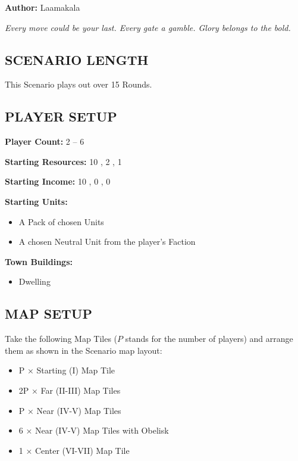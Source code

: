 
\begin{multicols*}{2}

\textbf{Author:} Laamakala

\textit{Every move could be your last. Every gate a gamble. Glory belongs to the bold.}

\subsection*{\MakeUppercase{Scenario Length}}
This Scenario plays out over 15 Rounds.

\subsection*{\MakeUppercase{Player Setup}}
\textbf{Player Count:} 2 -- 6

\textbf{Starting Resources:} 10 , 2 , 1 

\textbf{Starting Income:} 10 , 0 , 0 

\textbf{Starting Units:}

\begin{itemize}
  \item A Pack of chosen \bronze Units
  \item A chosen Neutral \bronze Unit from the player's Faction
\end{itemize}

\textbf{Town Buildings:}
\begin{itemize}
  \item \bronze Dwelling
\end{itemize}

\subsection*{\MakeUppercase{Map Setup}}
Take the following Map Tiles ($P$ stands for the number of players) and arrange them as shown in the Scenario map layout:

\begin{itemize}
  \item P × Starting (I) Map Tile
  \item 2P × Far (II-III) Map Tiles
  \item P × Near (IV-V) Map Tiles
  \item 6 × Near (IV-V) Map Tiles with Obelisk
  \item 1 × Center (VI-VII) Map Tile
\end{itemize}


\end{multicols*}
